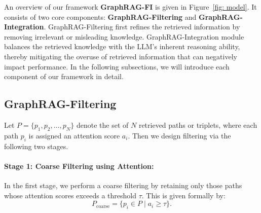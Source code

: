\documentclass[11pt]{article}
\begin{document}
An overview of our framework {\bf GraphRAG-FI} is given in Figure~\ref{fig: model}. It consists of two core components: {\bf GraphRAG-Filtering} and {\bf GraphRAG-Integration}. GraphRAG-Filtering first refines the retrieved information by removing irrelevant or misleading knowledge. GraphRAG-Integration module balances the retrieved knowledge with the LLM’s inherent reasoning ability, thereby mitigating the overuse of retrieved information that can negatively impact performance. In the following subsections, we will introduce each component of our framework in detail.



\subsection{GraphRAG-Filtering}
Let \( P = \{p_1, p_2, \ldots, p_N\} \) denote the set of $N$ retrieved paths or triplets, where each path \( p_i \) is assigned an attention score \( a_i \). 
Then we design filtering via the following two stages.

\paragraph{Stage 1: Coarse Filtering using Attention:}  
In the first stage, we perform a coarse filtering by retaining only those paths whose attention scores exceeds a  threshold \( \tau \). This is given formally by:
\begin{equation}
P_{\text{coarse}} = \{ p_i \in P \mid a_i \geq \tau \}.
\end{equation}
\end{document}
